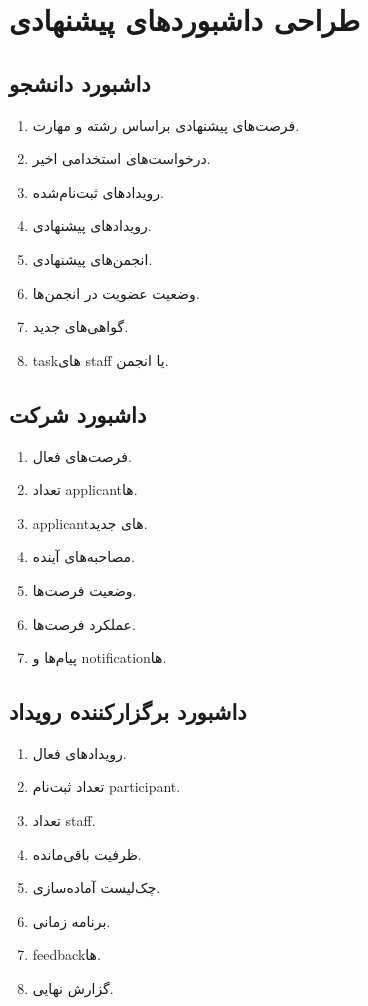 \documentclass[12pt,a4paper]{article}
\begin{document}
\section{طراحی داشبوردهای پیشنهادی}
\subsection{داشبورد دانشجو}
\begin{enumerate}
\item فرصت‌های پیشنهادی براساس رشته و مهارت.
\item درخواست‌های استخدامی اخیر.
\item رویدادهای ثبت‌نام‌شده.
\item رویدادهای پیشنهادی.
\item انجمن‌های پیشنهادی.
\item وضعیت عضویت در انجمن‌ها.
\item گواهی‌های جدید.
\item taskهای staff یا انجمن.
\end{enumerate}

\subsection{داشبورد شرکت}
\begin{enumerate}
\item فرصت‌های فعال.
\item تعداد applicantها.
\item applicantهای جدید.
\item مصاحبه‌های آینده.
\item وضعیت فرصت‌ها.
\item عملکرد فرصت‌ها.
\item پیام‌ها و notificationها.
\end{enumerate}

\subsection{داشبورد برگزارکننده رویداد}
\begin{enumerate}
\item رویدادهای فعال.
\item تعداد ثبت‌نام participant.
\item تعداد staff.
\item ظرفیت باقی‌مانده.
\item چک‌لیست آماده‌سازی.
\item برنامه زمانی.
\item feedbackها.
\item گزارش نهایی.
\end{enumerate}
\end{document}
